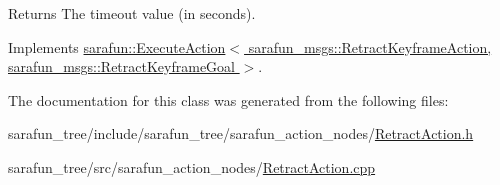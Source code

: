 \begin{DoxyReturn}{Returns}
The timeout value (in seconds). 
\end{DoxyReturn}


Implements \hyperlink{classsarafun_1_1ExecuteAction_aba6cfa8a8ce19e735eb6394424df6d17}{sarafun\-::\-Execute\-Action$<$ sarafun\-\_\-msgs\-::\-Retract\-Keyframe\-Action, sarafun\-\_\-msgs\-::\-Retract\-Keyframe\-Goal $>$}.



The documentation for this class was generated from the following files\-:\begin{DoxyCompactItemize}
\item 
sarafun\-\_\-tree/include/sarafun\-\_\-tree/sarafun\-\_\-action\-\_\-nodes/\hyperlink{RetractAction_8h}{Retract\-Action.\-h}\item 
sarafun\-\_\-tree/src/sarafun\-\_\-action\-\_\-nodes/\hyperlink{RetractAction_8cpp}{Retract\-Action.\-cpp}\end{DoxyCompactItemize}
